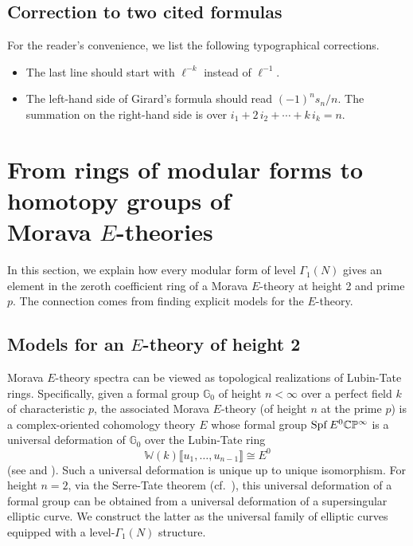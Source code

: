 \documentclass{gtpart}
\theoremstyle{definition}
\theoremstyle{remark}
\newcommand{\mb}[1]{\mathbb{#1}}
\newcommand{\Spf}{{\rm Spf\thinspace}}
\newcommand{\BC}{{\mb C}}
\newcommand{\BG}{{\mb G}}
\newcommand{\BP}{{\mb P}}
\newcommand{\BW}{{\mb W}}
\newcommand{\G}{\Gamma}
\newcommand{\lb}{\llbracket}
\newcommand{\rb}{\rrbracket}
\renewcommand{\=}{\approx}
\renewcommand{\-}{\sim}
\numberwithin{equation}{section}
\begin{document}
\subsection{Correction to two cited formulas}
\label{subsec:correction}

For the reader's convenience, we list the following typographical corrections.  
\begin{itemize}
 \item \cite[(1.11.0.4)]{padicprop} The last line should start with $\ell^{-k}$ 
 instead of $\ell^{-1}$.  

 \item \cite[Problem 16-A]{cc} The left-hand side of Girard's formula should 
 read $(-1)^n s_n / n$.  The summation on the right-hand side is over 
 $i_1 + 2\,i_2 + \cdots + k\,i_k = n$.  
\end{itemize}



\section{From rings of modular forms to homotopy groups of\\
         Morava $E$-theories}
\label{sec:mf2E}

In this section, we explain how every modular form of level $\G_1(N)$ gives an 
element in the zeroth coefficient ring of a Morava $E$-theory at height 2 and 
prime $p$.  The connection comes from finding explicit models for the 
$E$-theory.  



\subsection{Models for an $E$-theory of height 2}
\label{subsec:model}

Morava $E$-theory spectra can be viewed as topological realizations of 
Lubin-Tate rings.  Specifically, given a formal group $\BG_0$ of height 
$n < \infty$ over a perfect field $k$ of characteristic $p$, the associated 
Morava $E$-theory (of height $n$ at the prime $p$) is a complex-oriented 
cohomology theory $E$ whose formal group $\Spf E^0 \BC\BP^\infty$ is a universal 
deformation of $\BG_0$ over the Lubin-Tate ring 
\[
 \BW(k) \lb u_1, \ldots, u_{n - 1} \rb \cong E^0 
\]
(see \cite[Section 3]{LT} and \cite[Section 7]{GH}).  Such a universal 
deformation is unique up to unique isomorphism.  For height $n = 2$, via the 
Serre-Tate theorem \cite{LST} (cf.~\cite[Theorem 2.9.1]{KM}), this universal 
deformation of a formal group can be obtained from a universal deformation of a 
supersingular elliptic curve.  We construct the latter as the universal family 
of elliptic curves equipped with a level-$\G_1(N)$ structure.  
\end{document}
